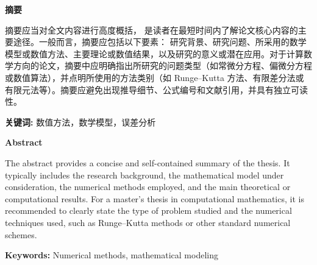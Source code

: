 \documentclass[UTF8, a4paper, zihao=-4]{ctexart} %
\numberwithin{equation}{section}%
\begin{document}
\begin{titlepage}

\begin{center}
{\Huge \bfseries 摘\quad 要} \\[1ex]
\end{center}
\vspace{\baselineskip}

\begin{center}
\parbox{\textwidth}{
    \hspace{2em}摘要应当对全文内容进行高度概括，
    是读者在最短时间内了解论文核心内容的主要途径。一般而言，摘要应包括以下要素：
    研究背景、研究问题、所采用的数学模型或数值方法、主要理论或数值结果，以及研究的意义或潜在应用。对于计算数学方向的论文，摘要中应明确指出所研究的问题类型（如常微分方程、偏微分方程或数值算法），并点明所使用的方法类别（如 Runge--Kutta 方法、有限差分法或有限元法等）。摘要应避免出现推导细节、公式编号和文献引用，并具有独立可读性。

    \vspace{1em}
    \noindent \textbf{关键词:} 数值方法，数学模型，误差分析
}
\end{center}

\end{titlepage}

\newpage


\begin{titlepage}

\begin{center}
{\Huge \bfseries Abstract} \\[1ex]
\end{center}

\begin{center}
\parbox{\textwidth}{
        \hspace{2em}The abstract provides a concise and self-contained summary of the thesis. It typically includes the research background, the mathematical model under consideration, the numerical methods employed, and the main theoretical or computational results. For a master's thesis in computational mathematics, it is recommended to clearly state the type of problem studied and the numerical techniques used, such as Runge--Kutta methods or other standard numerical schemes.
        
    \vspace{1em}
    
    \noindent \textbf{Keywords:} Numerical methods, mathematical modeling
}
\end{center}

\end{titlepage}
\end{document}
